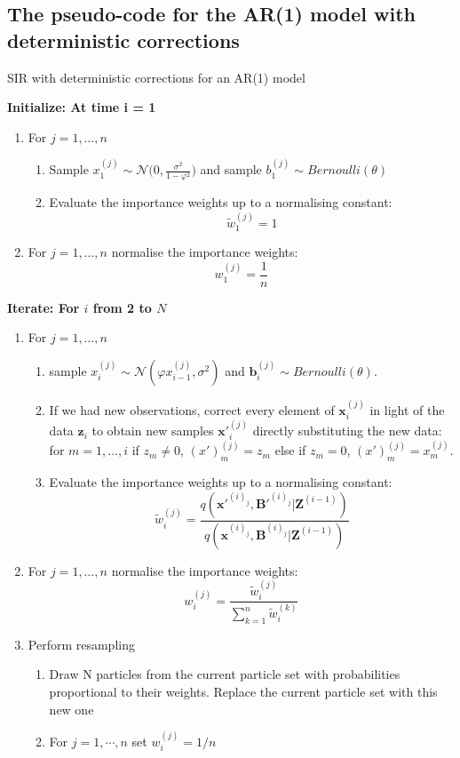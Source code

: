 \documentclass[11pt,a4paper]{article}
\renewcommand{\vec}[1]{\mathbf{#1}}
\begin{document}
{\subsection{The pseudo-code for the AR(1) model with deterministic corrections}

\begin{algorithm}[H]
\caption{SIR with deterministic corrections for an AR(1) model}\label{euclid}
 \begin{algorithmic}

 \State  \bf{Initialize:} \normalfont At time i = 1
            
\begin{enumerate}
	\item For $j = 1, \dots , n$
	\begin{enumerate}
		\item Sample $x_{1}^{(j)} \sim \mathcal{N} \Bigg (0, \frac{\sigma^2}{1- \varphi^2} \Bigg)$ and sample $b_1^{(j)} \sim Bernoulli(\theta)$
		\item Evaluate the importance weights up to a normalising constant:
		\[
		\tilde{w}^{(j)}_{1} = 1
		\]
	\end{enumerate}
	\item For $j = 1, \dots , n$ normalise the importance weights: 
	\[
	w^{(j)}_{1} = \frac{1}{n}
	\]
\end{enumerate}

 \State  \bf{Iterate:} \normalfont For $i$ from 2 to $N$

\begin{enumerate}
	\item For $j = 1, \dots , n$
	\begin{enumerate}
  		\item sample $x_{i}^{(j)} \sim \mathcal{N} (\varphi x_{i-1}^{(j)}, \sigma^{2})$ and $\vec{b}_i^{(j)} \sim Bernoulli(\theta)$.
		\item {If we had new observations, correct every element of $\vec{x}_{i}^{(j)}$ in light of the data $\vec{z}_{i}$ to obtain new samples $\vec{x'}_{i}^{(j)}$ directly substituting the new data: for $m = 1, \dots ,i$ if $z_{m} \neq 0$, $(x')_m^{(j)} = z_{m}$ else if $z_{m} = 0$, $(x')_m^{(j)} = x_m^{(j)}$.}
		\item Evaluate the importance weights up to a normalising constant:
		\[
		\tilde{w}^{(j)}_{i} = \frac{q(\vec{x'}^{(i)_j}, \vec{B'}^{(i)_j} | \vec{Z}^{(i-1)})}{q(\vec{x}^{(i)_j}, \vec{B}^{(i)_j} | \vec{Z}^{(i-1)})}
		\]
	\end{enumerate}
	\item For $j = 1, \dots , n$ normalise the importance weights:
	\[
	w^{(j)}_{i} = \frac{\tilde{w}^{(j)}_{i}}{\sum_{k=1}^{n}\tilde{w}^{(k)}_{i}}
	\]
	\item Perform resampling
	\begin{enumerate}
	    \item Draw N particles from the current particle set with probabilities proportional to their weights. Replace the current particle set with this new one
	    \item For $j=1,\cdots ,n$ set $w_{i}^{(j)}=1/n$
	\end{enumerate}
	


\end{enumerate}
\end{algorithmic}
\end{algorithm}}
\end{document}
